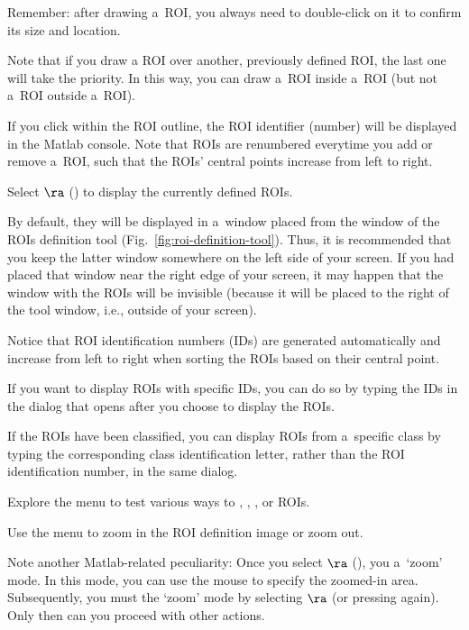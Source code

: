 \nb
\bul Remember: after drawing a~ROI, you always need to double-click on it to confirm its size and location.

\bul Note that if you draw a ROI over another, previously defined ROI, the last one will take the priority. In this way, you can draw a~ROI inside a~ROI (but not a~ROI outside a~ROI).

\bul If you click within the ROI outline, the ROI identifier (number) will be displayed in the Matlab console. Note that ROIs are renumbered everytime you add or remove a~ROI, such that the ROIs' central points increase from left to right.

\s Select  $\ra$  () to display the currently defined ROIs.

\nb
\bul By default, they will be displayed in a~window placed  from the window of the ROIs definition tool (Fig.~\ref{fig:roi-definition-tool}). Thus, it is recommended that you keep the latter window somewhere on the left side of your screen. If you had placed that window near the right edge of your screen, it may happen that the window with the ROIs will be invisible (because it will be placed to the right of the tool window, i.e., outside of your screen).

\bul Notice that ROI identification numbers (IDs) are generated automatically and increase from left to right when sorting the ROIs based on their central point.

\bul If you want to display ROIs with specific IDs, you can do so by typing the IDs in the dialog that opens after you choose to display the ROIs.

\bul If the ROIs have been classified, you can display ROIs from a~specific class by typing the corresponding class identification letter, rather than the ROI identification number, in the same dialog.

\s Explore the  menu to test various ways to , , , or  ROIs.

\s Use the  menu to zoom in the ROI definition image or zoom out.

\nb
\bul Note another Matlab-related peculiarity: Once you select  $\ra$  (), you  a~`zoom' mode. In this mode, you can use the mouse to specify the zoomed-in area. Subsequently, you must  the `zoom' mode by selecting  $\ra$  (or pressing  again). Only then can you proceed with other actions.


